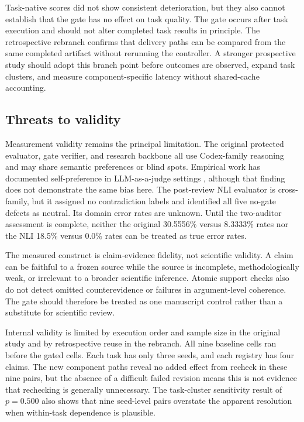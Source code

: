 \documentclass[11pt]{article}
\begin{document}
Task-native scores did not show consistent deterioration, but they also cannot establish that the gate has no effect on task quality. The gate occurs after task execution and should not alter completed task results in principle. The retrospective rebranch confirms that delivery paths can be compared from the same completed artifact without rerunning the controller. A stronger prospective study should adopt this branch point before outcomes are observed, expand task clusters, and measure component-specific latency without shared-cache accounting.

\subsection{Threats to validity}

Measurement validity remains the principal limitation. The original protected evaluator, gate verifier, and research backbone all use Codex-family reasoning and may share semantic preferences or blind spots. Empirical work has documented self-preference in LLM-as-a-judge settings \cite{selfpreference}, although that finding does not demonstrate the same bias here. The post-review NLI evaluator is cross-family, but it assigned no contradiction labels and identified all five no-gate defects as neutral. Its domain error rates are unknown. Until the two-auditor assessment is complete, neither the original 30.5556\% versus 8.3333\% rates nor the NLI 18.5\% versus 0.0\% rates can be treated as true error rates.

The measured construct is claim-evidence fidelity, not scientific validity. A claim can be faithful to a frozen source while the source is incomplete, methodologically weak, or irrelevant to a broader scientific inference. Atomic support checks also do not detect omitted counterevidence or failures in argument-level coherence. The gate should therefore be treated as one manuscript control rather than a substitute for scientific review.

Internal validity is limited by execution order and sample size in the original study and by retrospective reuse in the rebranch. All nine baseline cells ran before the gated cells. Each task has only three seeds, and each registry has four claims. The new component paths reveal no added effect from recheck in these nine pairs, but the absence of a difficult failed revision means this is not evidence that rechecking is generally unnecessary. The task-cluster sensitivity result of $p=0.500$ also shows that nine seed-level pairs overstate the apparent resolution when within-task dependence is plausible.
\end{document}
